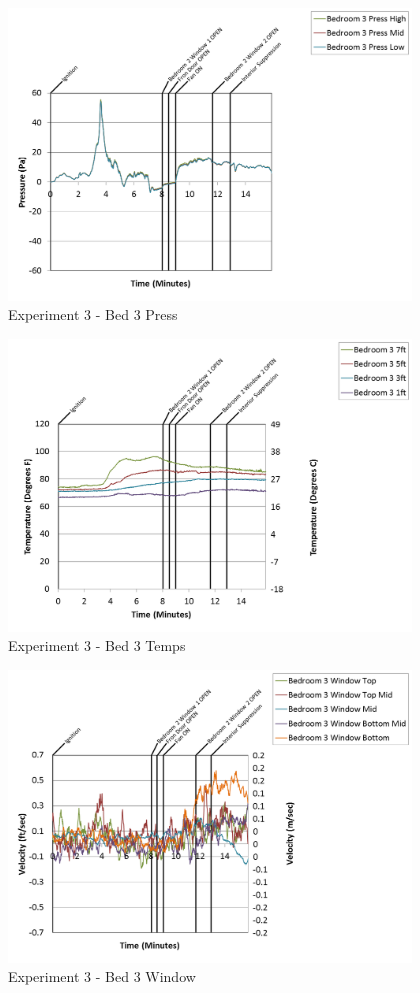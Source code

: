 \documentclass{article}
\begin{document}
\begin{appendices}
\clearpage

\begin{figure}[h!]
	\centering
	\includegraphics[height=3.05in]{0_Images/Results_Charts/Exp_3_Charts/Bed3Press.png}
	\caption{Experiment 3 - Bed 3 Press}
\end{figure}


\begin{figure}[h!]
	\centering
	\includegraphics[height=3.05in]{0_Images/Results_Charts/Exp_3_Charts/Bed3Temps.png}
	\caption{Experiment 3 - Bed 3 Temps}
\end{figure}

\clearpage

\begin{figure}[h!]
	\centering
	\includegraphics[height=3.05in]{0_Images/Results_Charts/Exp_3_Charts/Bed3Window.png}
	\caption{Experiment 3 - Bed 3 Window}
\end{figure}



\end{appendices}
\end{document}
